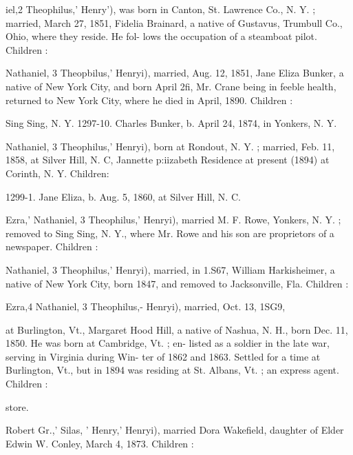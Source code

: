 \documentclass{book}
\begin{document}
iel,2 Theophilus,' Henry'), was born in Canton, St. Lawrence 
Co., N. Y. ; married, March 27, 1851, Fidelia Brainard, a native 
of Gustavus, Trumbull Co., Ohio, where they reside. He fol- 
lows the occupation of a steamboat pilot. Children : 





Nathaniel, 3 Theopbilus,' Henryi), married, Aug. 12, 1851, Jane 
Eliza Bunker, a native of New York City, and born April 2fi, 
Mr. Crane being in feeble health, returned to New York City, 
where he died in April, 1890. Children : 



Sing Sing, N. Y. 
1297-10. Charles Bunker, b. April 24, 1874, in Yonkers, N. Y. 

Nathaniel, 3 Theophilus,' Henryi), born at Rondout, N. Y. ; 
married, Feb. 11, 1858, at Silver Hill, N. C, Jannette p:iizabeth 
Residence at present (1894) at Corinth, N. Y. Children: 

1299-1. Jane Eliza, b. Aug. 5, 1860, at Silver Hill, N. C. 










Ezra,' Nathaniel, 3 Theophilus,' Henryi), married M. F. Rowe, 
Yonkers, N. Y. ; removed to Sing Sing, N. Y., where Mr. Rowe 
and his son are proprietors of a newspaper. Children : 



Nathaniel, 3 Theophilus,' Henryi), married, in 1.S67, William 
Harkisheimer, a native of New York City, born 1847, and 
removed to Jacksonville, Fla. Children : 




Ezra,4 Nathaniel, 3 Theophilus,- Henryi), married, Oct. 13, 1SG9, 




at Burlington, Vt., Margaret Hood Hill, a native of Nashua, N. 
H., born Dec. 11, 1850. He was born at Cambridge, Vt. ; en- 
listed as a soldier in the late war, serving in Virginia during Win- 
ter of 1862 and 1863. Settled for a time at Burlington, Vt., but 
in 1894 was residing at St. Albans, Vt. ; an express agent. 
Children : 


store. 

Robert Gr.,' Silas, ' Henry,' Henryi), married Dora Wakefield, 
daughter of Elder Edwin W. Conley, March 4, 1873. Children : 
\end{document}
